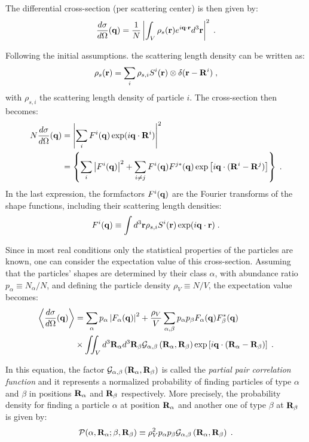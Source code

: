 The differential cross-section (per scattering center) is then given by:
\begin{equation*}
  \frac{d\sigma}{d\Omega}(\mathbf{q}) = \frac{1}{N}\left\lvert \int_V \rho_s(\mathbf{r}) e^{i\mathbf{q}\cdot\mathbf{r}} d^3\mathbf{r} \right\rvert ^2 \; .
\end{equation*}

Following the initial assumptions. the scattering length density can be written as:
\begin{equation*}
\rho_s(\mathbf{r}) = \sum_i \rho_{s,i} S^i(\mathbf{r}) \otimes \delta (\mathbf{r}-\mathbf{R}^i) \; ,
\end{equation*}
with $\rho_{s,i}$ the scattering length density of particle $i$. The cross-section then becomes:
\begin{align*}
  N\frac{d\sigma}{d\Omega}(\mathbf{q}) & = \left\lvert \sum_i F^i(\mathbf{q}) \exp (i\mathbf{q}\cdot\mathbf{R}^i) \right\rvert ^2  \\
  & = \left\lbrace \sum_i \left\lvert F^i(\mathbf{q}) \right\rvert ^2 + \sum_{i\neq j} F^i(\mathbf{q}) F^{j*}(\mathbf{q}) \exp \left[i\mathbf{q}\cdot (\mathbf{R}^i-\mathbf{R}^j)\right] \right\rbrace \; .
\end{align*}
In the last expression, the formfactors $F^i(\mathbf{q})$ are the Fourier transforms of the shape functions, including their scattering length densities:
\begin{equation*}
  F^i(\mathbf{q}) \equiv \int d^3\mathbf{r} \rho_{s,i} S^i(\mathbf{r}) \exp (i\mathbf{q}\cdot\mathbf{r} ) \; .
\end{equation*}

Since in most real conditions only the statistical properties of the particles are known, one can consider the expectation value of this cross-section. Assuming that the particles' shapes are determined by their class $\alpha$, with abundance ratio $p_\alpha \equiv N_\alpha / N$, and defining the particle density $\rho_V \equiv N/V$, the expectation value becomes:
\begin{align*}
  \left\langle \frac{d\sigma}{d\Omega}(\mathbf{q}) \right\rangle  & = \sum_\alpha p_\alpha \left\lvert F_\alpha(\mathbf{q})\right\rvert ^2 + \frac{\rho_V}{V}\sum_{\alpha,\beta} p_\alpha p_\beta F_\alpha (\mathbf{q})F_\beta^*(\mathbf{q})  \\
  & \times \iint_V d^3\mathbf{R}_\alpha d^3\mathbf{R}_\beta \mathcal{G}_{\alpha ,\beta}\left( \mathbf{R}_{\alpha} , \mathbf{R}_{\beta} \right) \exp \left[ i\mathbf{q}\cdot (\mathbf{R}_\alpha - \mathbf{R}_\beta ) \right] \; .
\end{align*}

In this equation, the factor $\mathcal{G}_{\alpha ,\beta}\left( \mathbf{R}_{\alpha} , \mathbf{R}_{\beta} \right)$ is called the \emph{partial pair correlation function} and it represents a normalized probability of finding particles of type $\alpha$ and $\beta$ in positions $\mathbf{R}_\alpha$ and $\mathbf{R}_\beta$ respectively. More precisely, the probability density for finding a particle $\alpha$ at position $\mathbf{R}_\alpha$ and another one of type $\beta$ at $\mathbf{R}_\beta$ is given by:
\begin{equation*}
  \mathcal{P}(\alpha, \mathbf{R}_\alpha ; \beta , \mathbf{R}_\beta ) \equiv \rho_V^2 p_\alpha p_\beta \mathcal{G}_{\alpha ,\beta}\left( \mathbf{R}_{\alpha} , \mathbf{R}_{\beta} \right) \; .
\end{equation*}


